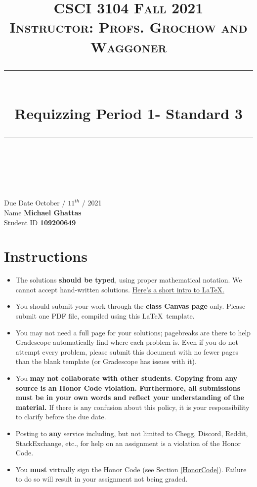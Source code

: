 \documentclass[11pt]{article}
\title{
\normalfont \normalsize 
\textsc{CSCI 3104 Fall 2021 \\ 
Instructor: Profs. Grochow and Waggoner} \\
[10pt] 
\rule{\linewidth}{0.5pt} \\[6pt] 
\huge Requizzing Period 1- Standard 3 \\
\rule{\linewidth}{2pt}  \\[10pt]
}
\date{}
\theoremstyle{definition}
\theoremstyle{definition}
\theoremstyle{definition}
\begin{document}
\maketitle


\noindent
Due Date \dotfill October / $11^{th}$ / 2021 \\
Name \dotfill \textbf{Michael Ghattas} \\
Student ID \dotfill \textbf{109200649} \\


\tableofcontents

\section{Instructions}
 \begin{itemize}
	\item The solutions \textbf{should be typed}, using proper mathematical notation. We cannot accept hand-written solutions. \href{http://ece.uprm.edu/~caceros/latex/introduction.pdf}{Here's a short intro to \LaTeX.}
	\item You should submit your work through the \textbf{class Canvas page} only. Please submit one PDF file, compiled using this \LaTeX \ template.
	\item You may not need a full page for your solutions; pagebreaks are there to help Gradescope automatically find where each problem is. Even if you do not attempt every problem, please submit this document with no fewer pages than the blank template (or Gradescope has issues with it).

	\item You \textbf{may not collaborate with other students}. \textbf{Copying from any source is an Honor Code violation. Furthermore, all submissions must be in your own words and reflect your understanding of the material.} If there is any confusion about this policy, it is your responsibility to clarify before the due date. 

	\item Posting to \textbf{any} service including, but not limited to Chegg, Discord, Reddit, StackExchange, etc., for help on an assignment is a violation of the Honor Code.

	\item You \textbf{must} virtually sign the Honor Code (see Section \ref{HonorCode}). Failure to do so will result in your assignment not being graded.
\end{itemize}
\end{document}
